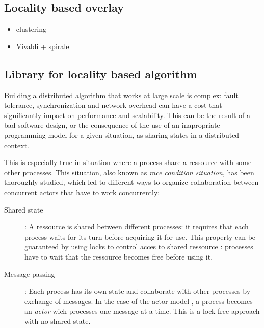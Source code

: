 

\subsection{Locality based overlay}

\begin{itemize}
	
	\item clustering
	
	\item Vivaldi + spirale

\end{itemize}

\subsection{Library for locality based algorithm}

Building a distributed algorithm that works at large scale is complex: fault
tolerance, synchronization and network overhead can have a cost that 
significantly impact on performance and scalability. This can be the result of a
bad software design, or the consequence of the use of an inapropriate 
programming model for a given situation, as sharing states in a distributed
context.

This is especially true in situation where a process share a ressource with some 
other processes. This situation, also known as \emph{race condition situation}, 
has been thoroughly studied, which led to different ways to organize 
collaboration between concurrent actors that have to work concurrently:

\begin{description}

	\item [Shared state] : A ressource is shared between different processes: it
	requires that each process waits for its turn before acquiring it for use.
	This property can be guaranteed by using locks to control acces to shared
	ressource : processes have to wait that the ressource becomes free
	before using it.

	\item [Message passing] : Each process has its own state and collaborate
	with other processes by exchange of messages. In the case of the actor model 
	\cite{Hewitt1973}, a process becomes an \emph{actor} wich processes one
	message at a time. This is a lock free approach with no	shared state.

\end{description}

